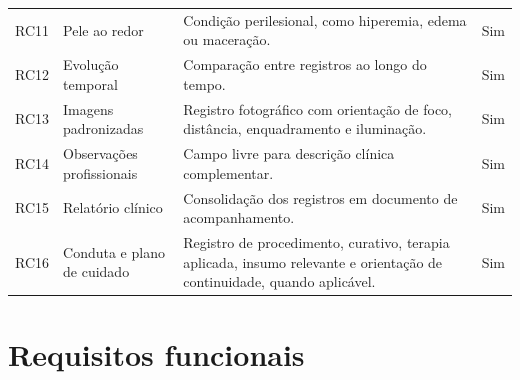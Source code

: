 \documentclass[
    12pt,
    oneside,
    a4paper,
    chapter=TITLE,
    brazil,
    sumario=tradicional,
    hidelinks
]{abntex2}
\begin{document}
\begin{longtable}{L{1.8cm}L{3.2cm}L{7.0cm}C{1.8cm}}
RC11 & Pele ao redor & Condição perilesional, como hiperemia, edema ou maceração. & Sim \\
RC12 & Evolução temporal & Comparação entre registros ao longo do tempo. & Sim \\
RC13 & Imagens padronizadas & Registro fotográfico com orientação de foco, distância, enquadramento e iluminação. & Sim \\
RC14 & Observações profissionais & Campo livre para descrição clínica complementar. & Sim \\
RC15 & Relatório clínico & Consolidação dos registros em documento de acompanhamento. & Sim \\
RC16 & Conduta e plano de cuidado & Registro de procedimento, curativo, terapia aplicada, insumo relevante e orientação de continuidade, quando aplicável. & Sim \\
\bottomrule
\end{longtable}

\chapter{Requisitos funcionais}
\end{document}
